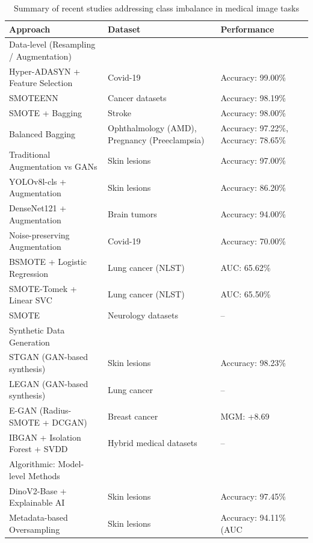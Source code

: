 \documentclass[twocolumn]{svjour3}
\begin{document}
\begin{table}[htbp]
\centering
\caption{Summary of recent studies addressing class imbalance in medical image tasks}
\label{tab:related_work_summary}
\begin{tabular}{lll}
\hline
Approach & Dataset & Performance \\
\hline
Data-level (Resampling / Augmentation) & & \\
Hyper-ADASYN + Feature Selection \cite{ref20} & Covid-19 & Accuracy: 99.00\% \\
SMOTEENN \cite{ref16} & Cancer datasets & Accuracy: 98.19\% \\
SMOTE + Bagging \cite{ref15} & Stroke & Accuracy: 98.00\% \\
Balanced Bagging \cite{ref19} & Ophthalmology (AMD), Pregnancy (Preeclampsia) & Accuracy: 97.22\%, Accuracy: 78.65\% \\
Traditional Augmentation vs GANs \cite{ref23} & Skin lesions & Accuracy: 97.00\% \\
YOLOv8l-cls + Augmentation \cite{ref22} & Skin lesions & Accuracy: 86.20\% \\
DenseNet121 + Augmentation \cite{ref24} & Brain tumors & Accuracy: 94.00\% \\
Noise-preserving Augmentation \cite{ref25} & Covid-19 & Accuracy: 70.00\% \\
BSMOTE + Logistic Regression \cite{ref13} & Lung cancer (NLST) & AUC: 65.62\% \\
SMOTE-Tomek + Linear SVC \cite{ref13} & Lung cancer (NLST) & AUC: 65.50\% \\
SMOTE \cite{ref14} & Neurology datasets & -- \\
\hline
Synthetic Data Generation & & \\
STGAN (GAN-based synthesis) \cite{ref27} & Skin lesions & Accuracy: 98.23\% \\
LEGAN (GAN-based synthesis) \cite{ref28} & Lung cancer & -- \\
E-GAN (Radius-SMOTE + DCGAN) \cite{ref29} & Breast cancer & MGM: +8.69 \\
IBGAN + Isolation Forest + SVDD \cite{ref30} & Hybrid medical datasets & -- \\
\hline
Algorithmic: Model-level Methods & & \\
DinoV2-Base + Explainable AI \cite{ref36} & Skin lesions & Accuracy: 97.45\% \\
Metadata-based Oversampling \cite{ref32} & Skin lesions & Accuracy: 94.11\% (AUC


\end{tabular}
\end{table}
\end{document}
